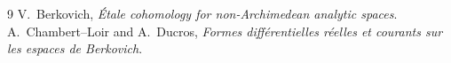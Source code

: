 \documentclass[11pt]{article}
\begin{document}



\begin{thebibliography}{9}
V.~Berkovich,
\emph{Étale cohomology for non-Archimedean analytic spaces}.
A.~Chambert--Loir and A.~Ducros,
\emph{Formes différentielles réelles et courants sur les espaces de Berkovich}.
\end{thebibliography}
\end{document}
